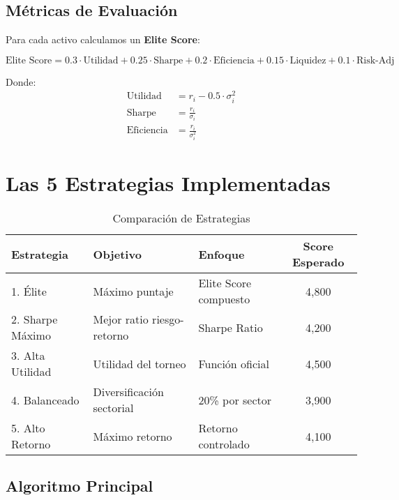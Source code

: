 \documentclass[11pt,a4paper]{article}
\begin{document}
	\subsection{Métricas de Evaluación}
	
	Para cada activo calculamos un \textbf{Elite Score}:
	
	\begin{equation}
		\text{Elite Score} = 0.3 \cdot \text{Utilidad} + 0.25 \cdot \text{Sharpe} + 0.2 \cdot \text{Eficiencia} + 0.15 \cdot \text{Liquidez} + 0.1 \cdot \text{Risk-Adj}
	\end{equation}
	
	Donde:
	\begin{align}
		\text{Utilidad} &= r_i - 0.5 \cdot \sigma_i^2 \\
		\text{Sharpe} &= \frac{r_i}{\sigma_i} \\
		\text{Eficiencia} &= \frac{r_i}{\sigma_i^2}
	\end{align}
	
	\section{Las 5 Estrategias Implementadas}
	
	\begin{table}[H]
		\centering
		\begin{tabular}{@{}lllc@{}}
			\toprule
			\textbf{Estrategia} & \textbf{Objetivo} & \textbf{Enfoque} & \textbf{Score Esperado} \\
			\midrule
			1. Élite & Máximo puntaje & Elite Score compuesto & 4,800 \\
			2. Sharpe Máximo & Mejor ratio riesgo-retorno & Sharpe Ratio & 4,200 \\
			3. Alta Utilidad & Utilidad del torneo & Función oficial & 4,500 \\
			4. Balanceado & Diversificación sectorial & 20\% por sector & 3,900 \\
			5. Alto Retorno & Máximo retorno & Retorno controlado & 4,100 \\
			\bottomrule
		\end{tabular}
		\caption{Comparación de Estrategias}
	\end{table}
	
	\subsection{Algoritmo Principal}
	
\end{document}
